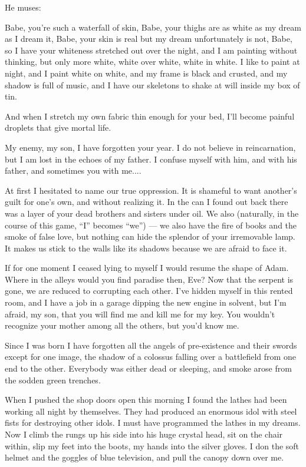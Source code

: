 \documentclass[english,11pt,letterpaper,onecolumn]{scrbook}
\begin{document}
He muses:

Babe, you're such a waterfall of skin, Babe, your thighs are as white as my dream as I dream it, Babe, your skin is real but my dream unfortunately is not, Babe, so I have your whiteness stretched out over the night, and I am painting without thinking, but only more white, white over white, white in white.  I like to paint at night, and I paint white on white, and my frame is black and crusted, and my shadow is full of music, and I have our skeletons to shake at will inside my box of tin.

And when I stretch my own fabric thin enough for your bed, I'll become painful droplets that give mortal life.

\newpage
{}
	My enemy, my son, I have forgotten your year.  I do not believe in reincarnation, but I am lost in the echoes of my father.  I confuse myself with him, and with his father, and sometimes you with me....
	
	At first I hesitated to name our true oppression.  It is shameful to want another's guilt for one's own, and without realizing it.  In the can I found out back there was a layer of your dead brothers and sisters under oil.  We also (naturally, in the course of this game, ``I'' becomes ``we'') --- we also have the fire of books and the smoke of false love, but nothing can hide the splendor of your irremovable lamp.  It makes us stick to the walls like its shadows because we are afraid to face it.
	
	If for one moment I ceased lying to myself I would resume the shape of Adam.  Where in the alleys would you find paradise then, Eve?  Now that the serpent is gone, we are reduced to corrupting each other.  I've hidden myself in this rented room, and I have a job in a garage dipping the new engine in solvent, but I'm afraid, my son, that you will find me and kill me for my key.  You wouldn't recognize your mother among all the others, but you'd know me.

	Since I was born I have forgotten all the angels of pre-existence and their swords except for one image, the shadow of a colossus falling over a battlefield from one end to the other.  Everybody was either dead or sleeping, and smoke arose from the sodden green trenches.

	When I pushed the shop doors open this morning I found the lathes had been working all night by themselves.  They had produced an enormous idol with steel fists for destroying other idols.  I must have programmed the lathes in my dreams.  Now I climb the rungs up his side into his huge crystal head, sit on the chair within, slip my feet into the boots, my hands into the silver gloves.  I don the soft helmet and the goggles of blue television, and pull the canopy down over me.
\end{document}
